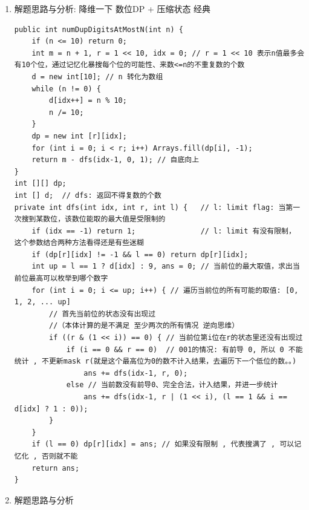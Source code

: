 \documentclass[9pt, b5paaper]{book}
\begin{document}
\begin{enumerate}
\item 解题思路与分析: 降维一下 数位DP + 压缩状态 经典
\label{sec-1-4-14-1}
\begin{verbatim}
public int numDupDigitsAtMostN(int n) {
    if (n <= 10) return 0;
    int m = n + 1, r = 1 << 10, idx = 0; // r = 1 << 10 表示n值最多会有10个位，通过记忆化暴搜每个位的可能性、来数<=n的不重复数的个数
    d = new int[10]; // n 转化为数组
    while (n != 0) {
        d[idx++] = n % 10;
        n /= 10;
    }
    dp = new int [r][idx];
    for (int i = 0; i < r; i++) Arrays.fill(dp[i], -1);
    return m - dfs(idx-1, 0, 1); // 自底向上 
}
int [][] dp;
int [] d;  // dfs: 返回不得复数的个数
private int dfs(int idx, int r, int l) {   // l: limit flag: 当第一次搜到某数位，该数位能取的最大值是受限制的
    if (idx == -1) return 1;               // l: limit 有没有限制， 这个参数结合两种方法看得还是有些迷糊
    if (dp[r][idx] != -1 && l == 0) return dp[r][idx];
    int up = l == 1 ? d[idx] : 9, ans = 0; // 当前位的最大取值，求出当前位最高可以枚举到哪个数字
    for (int i = 0; i <= up; i++) { // 遍历当前位的所有可能的取值: [0, 1, 2, ... up]
        // 首先当前位的状态没有出现过 
        //（本体计算的是不满足 至少两次的所有情况 逆向思维） 
        if ((r & (1 << i)) == 0) { // 当前位第i位在r的状态里还没有出现过
            if (i == 0 && r == 0)  // 001的情况: 有前导 0, 所以 0 不能统计 , 不更新mask r(就是这个最高位为0的数不计入结果，去遍历下一个低位的数。。)
                ans += dfs(idx-1, r, 0);
            else // 当前数没有前导0、完全合法，计入结果，并进一步统计
                ans += dfs(idx-1, r | (1 << i), (l == 1 && i == d[idx] ? 1 : 0));
        }
    }
    if (l == 0) dp[r][idx] = ans; // 如果没有限制 , 代表搜满了 , 可以记忆化 , 否则就不能
    return ans;
}
\end{verbatim}
\item 解题思路与分析
\label{sec-1-4-14-2}


\end{enumerate}
\end{document}
